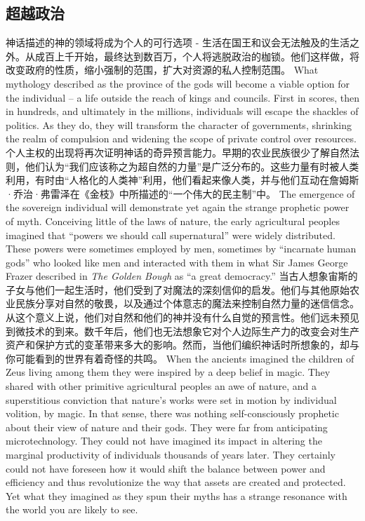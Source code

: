\subsection{超越政治}
\begin{paracol}{2}[]
神话描述的神的领域将成为个人的可行选项 - 生活在国王和议会无法触及的生活之外。从成百上千开始，最终达到数百万，个人将逃脱政治的枷锁。他们这样做，将改变政府的性质，缩小强制的范围，扩大对资源的私人控制范围。
\switchcolumn
What mythology described as the province of the gods will become a viable option for the individual -- a life outside the reach of kings and councils. First in scores, then in hundreds, and ultimately in the millions, individuals will escape the shackles of politics. As they do, they will transform the character of governments, shrinking the realm of compulsion and widening the scope of private control over resources.
\switchcolumn*
个人主权的出现将再次证明神话的奇异预言能力。早期的农业民族很少了解自然法则，他们认为“我们应该称之为超自然的力量”是广泛分布的。这些力量有时被人类利用，有时由“人格化的人类神”利用，他们看起来像人类，并与他们互动在詹姆斯·乔治·弗雷泽在《金枝》中所描述的“一个伟大的民主制”中。
\switchcolumn
The emergence of the sovereign individual will demonstrate yet again the strange prophetic power of myth. Conceiving little of the laws of nature, the early agricultural peoples imagined that “powers we should call supernatural” were widely distributed. These powers were sometimes employed by men, sometimes by “incarnate human gods” who looked like men and interacted with them in what Sir James George Frazer described in \emph{The Golden Bough} as “a great democracy.”
\switchcolumn*
当古人想象宙斯的子女与他们一起生活时，他们受到了对魔法的深刻信仰的启发。他们与其他原始农业民族分享对自然的敬畏，以及通过个体意志的魔法来控制自然力量的迷信信念。从这个意义上说，他们对自然和他们的神并没有什么自觉的预言性。他们远未预见到微技术的到来。数千年后，他们也无法想象它对个人边际生产力的改变会对生产资产和保护方式的变革带来多大的影响。然而，当他们编织神话时所想象的，却与你可能看到的世界有着奇怪的共鸣。
\switchcolumn
When the ancients imagined the children of Zeus living among them they were inspired by a deep belief in magic. They shared with other primitive agricultural peoples an awe of nature, and a superstitious conviction that nature's works were set in motion by individual volition, by magic. In that sense, there was nothing self-consciously prophetic about their view of nature and their gods. They were far from anticipating microtechnology. They could not have imagined its impact in altering the marginal productivity of individuals thousands of years later. They certainly could not have foreseen how it would shift the balance between power and efficiency and thus revolutionize the way that assets are created and protected. Yet what they imagined as they spun their myths has a strange resonance with the world you are likely to see.
\end{paracol}

